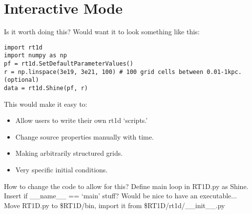 \documentclass[letterpaper,titlepage,12pt]{article}
\numberwithin{equation}{section}
\begin{document}
\section{Interactive Mode}
Is it worth doing this?  Would want it to look something like this:

\begin{verbatim}
import rt1d
import numpy as np
pf = rt1d.SetDefaultParameterValues()
r = np.linspace(3e19, 3e21, 100) # 100 grid cells between 0.01-1kpc. (optional)
data = rt1d.Shine(pf, r)    
\end{verbatim}    

This would make it easy to:
\begin{itemize}
    \item Allow users to write their own rt1d `scripts.'
    \item Change source properties manually with time.
    \item Making arbitrarily structured grids.
    \item Very specific initial conditions.
\end{itemize}    

How to change the code to allow for this?
Define main loop in RT1D.py as Shine.  Insert if __name__ == `main' stuff?
Would be nice to have an executable...
Move RT1D.py to \$RT1D/bin, import it from \$RT1D/rt1d/__init__.py

\newpage


\end{document}
